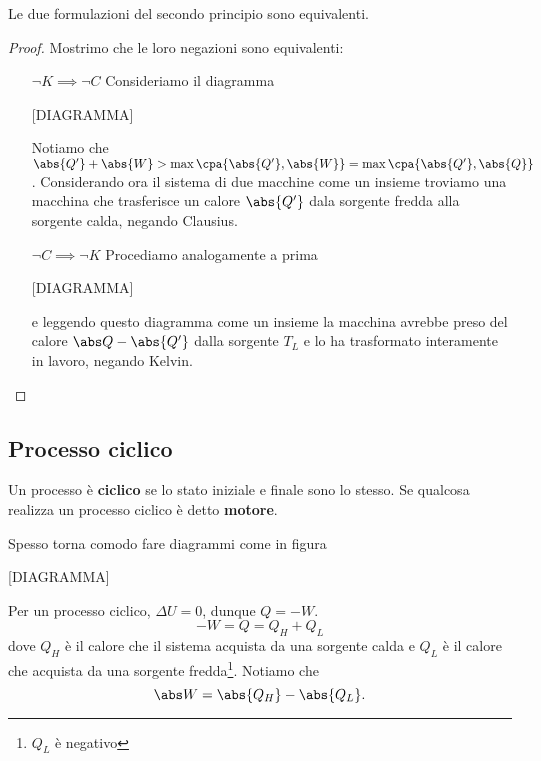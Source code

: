 \begin{proposition}
Le due formulazioni del secondo principio sono equivalenti.
\end{proposition}
\begin{proof}
Mostrimo che le loro negazioni sono equivalenti:
\setlength{\leftmargini}{0cm}
\begin{itemize}
\item[$\boxed{\neg K\implies \neg C}$] Consideriamo il diagramma

[DIAGRAMMA]

Notiamo che $\abs{Q'}+\abs{W}>\max{\cpa{\abs{Q'},\abs{W}}}=\max{\cpa{\abs{Q'},\abs{Q}}}$. Considerando ora il sistema di due macchine come un insieme troviamo una macchina che trasferisce un calore $\abs{Q'}$ dala sorgente fredda alla sorgente calda, negando Clausius.
\item[$\boxed{\neg C\implies \neg K}$] Procediamo analogamente a prima

[DIAGRAMMA]

e leggendo questo diagramma come un insieme la macchina avrebbe preso del calore $\abs Q-\abs{Q'}$ dalla sorgente $T_L$ e lo ha trasformato interamente in lavoro, negando Kelvin.
\end{itemize}
\setlength{\leftmargini}{0.5cm}
\end{proof}

\subsection{Processo ciclico}
\begin{definition}
Un processo \`e \textbf{ciclico} se lo stato iniziale e finale sono lo stesso. Se qualcosa realizza un processo ciclico \`e detto \textbf{motore}.
\end{definition}

\begin{remark}
Spesso torna comodo fare diagrammi come in figura

[DIAGRAMMA]
\end{remark}

\begin{remark}
Per un processo ciclico, $\Delta U=0$, dunque $Q=-W$.
\[-W=Q=Q_H+Q_L\]
dove $Q_H$ \`e il calore che il sistema acquista da una sorgente calda e $Q_L$ \`e il calore che acquista da una sorgente fredda\footnote{$Q_L$ \`e negativo}. Notiamo che
\[\abs W=\abs{Q_H}-\abs{Q_L}.\]
\end{remark}

